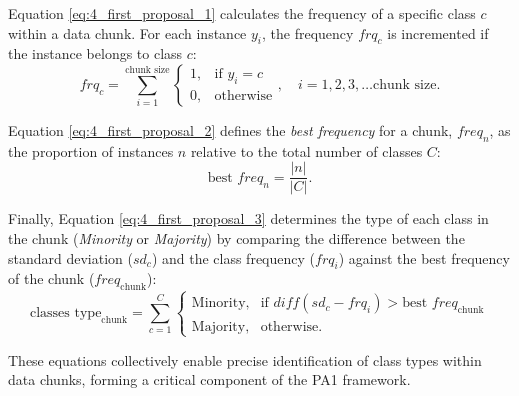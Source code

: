 	Equation \ref{eq:4_first_proposal_1} calculates the frequency of a specific class \(c\) within a data chunk. For each instance \(y_i\), the frequency \(frq_{c}\) is incremented if the instance belongs to class \(c\):  
	\begin{equation}
	\label{eq:4_first_proposal_1}
	frq_{c} = \sum_{i=1}^{\text{chunk size}} 
	\begin{cases} 
	1, & \text{if } y_i = c \\
	0, & \text{otherwise}
	\end{cases}, \quad i = 1, 2, 3, \dots \text{chunk size}.
	\end{equation}
	
	Equation \ref{eq:4_first_proposal_2} defines the \textit{best frequency} for a chunk, \(freq_n\), as the proportion of instances \(n\) relative to the total number of classes \(C\):  
	\begin{equation}
	\label{eq:4_first_proposal_2}
	\text{best } freq_{n} = \frac{|n|}{|C|}.
	\end{equation}
	
	Finally, Equation \ref{eq:4_first_proposal_3} determines the type of each class in the chunk (\textit{Minority} or \textit{Majority}) by comparing the difference between the standard deviation (\(sd_c\)) and the class frequency (\(frq_i\)) against the best frequency of the chunk (\(freq_{\text{chunk}}\)):  
	\begin{equation}
	\label{eq:4_first_proposal_3}
	\text{classes type}_{\text{chunk}} = \sum_{c=1}^{C} 
	\begin{cases} 
	\text{Minority,} & \text{if } diff(sd_c - frq_i) > \text{best } freq_{\text{chunk}} \\
	\text{Majority,} & \text{otherwise}.
	\end{cases}
	\end{equation}
	
	These equations collectively enable precise identification of class types within data chunks, forming a critical component of the PA1 framework.
	
	